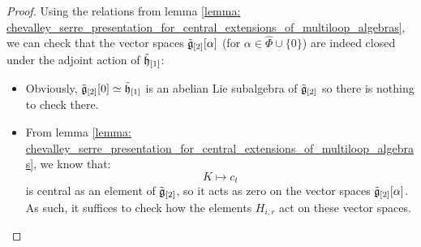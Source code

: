             \begin{proof}
                Using the relations from lemma \ref{lemma: chevalley_serre_presentation_for_central_extensions_of_multiloop_algebras}, we can check that the vector spaces $\tilde{\mathfrak{g}}_{[2]}[\alpha]$ (for $\alpha \in \hat{\Phi} \cup \{0\}$) are indeed closed under the adjoint action of $\tilde{\mathfrak{h}}_{[1]}$:
                \begin{itemize}
                    \item Obviously, $\tilde{\mathfrak{g}}_{[2]}[0] \simeq \tilde{\mathfrak{h}}_{[1]}$ is an abelian Lie subalgebra of $\tilde{\mathfrak{g}}_{[2]}$ so there is nothing to check there.
                    \item From lemma \ref{lemma: chevalley_serre_presentation_for_central_extensions_of_multiloop_algebras}, we know that:
                        $$K \mapsto c_t$$
                    is central as an element of $\tilde{\mathfrak{g}}_{[2]}$, so it acts as zero on the vector spaces $\tilde{\mathfrak{g}}_{[2]}[\alpha]$. As such, it suffices to check how the elements $H_{i, r}$ act on these vector spaces. 
                    

\end{itemize}
\end{proof}
